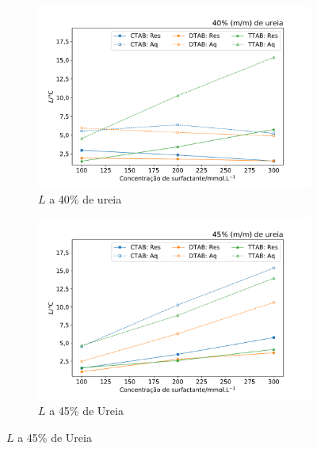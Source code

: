 		\begin{figure}[H]
	 	\centering
	 	\begin{subfigure}[t]{0.45\textwidth}
	 		\includegraphics[width=\textwidth]{./imagens/dsc/L_40p_1_300mM_aq_res}
	 		\caption{$L$ a 40\% de ureia}
	 		\label{fig:DSC_L_40pUr}
	 	\end{subfigure} \qquad %
	 	\begin{subfigure}[t]{0.45\textwidth}
	 		\includegraphics[width=\textwidth]{./imagens/dsc/L_45p_1_300mM_aq_res}
	 		\caption{$L$ a 45\% de Ureia}
	 		\label{fig:DSC_L_45pUr}
	 	\end{subfigure}
 	

\end{figure}
